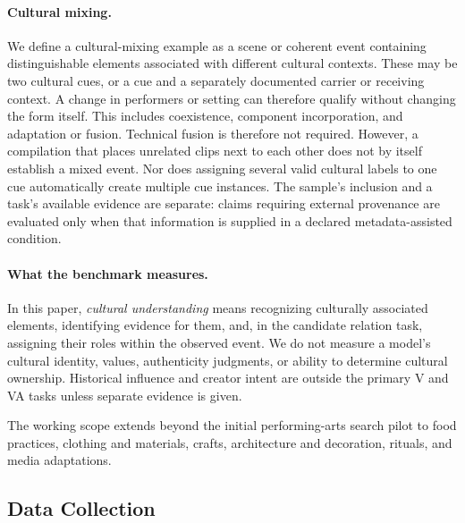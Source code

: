 \paragraph{Cultural mixing.}
We define a cultural-mixing example as a scene or coherent event containing
distinguishable elements associated with different cultural contexts.
These may be two cultural cues, or a cue and a separately documented
carrier or receiving context. A change in performers or setting can
therefore qualify without changing the form itself. This includes
coexistence, component incorporation, and adaptation or fusion.
Technical fusion is therefore not required. However, a compilation that
places unrelated clips next to each other does not by itself establish a
mixed event. Nor does assigning several valid cultural labels to one cue
automatically create multiple cue instances.
The sample's inclusion and a task's available evidence are separate:
claims requiring external provenance are evaluated only when that
information is supplied in a declared metadata-assisted condition.

\paragraph{What the benchmark measures.}
In this paper, \emph{cultural understanding} means recognizing culturally
associated elements, identifying evidence for them, and, in the candidate
relation task, assigning their roles within the observed event. We do not
measure a model's cultural identity, values, authenticity judgments, or
ability to determine cultural ownership. Historical influence and creator
intent are outside the primary V and VA tasks unless separate evidence is given.

The working scope extends beyond the initial performing-arts search pilot
to food practices, clothing and materials, crafts, architecture and
decoration, rituals, and media adaptations.

\subsection{Data Collection}

